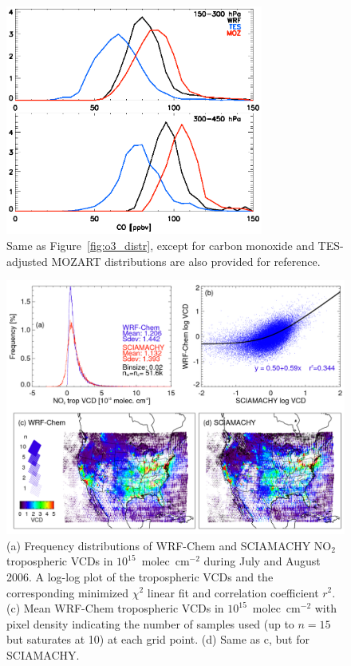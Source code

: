  \begin{figure}
 \noindent\includegraphics[width=20pc]{figures/co/co_teswrfhist.eps} %
 \caption{Same as Figure~\ref{fig:o3_distr}, except for carbon monoxide and TES-adjusted
MOZART distributions are also provided for reference.}
 \label{fig:co_distr}
 \end{figure}

 \begin{figure}
 \noindent\includegraphics[width=40pc]{figures/scia_no2.png}
 \caption{(a) Frequency distributions of WRF-Chem and SCIAMACHY NO$_2$ tropospheric
VCDs in $10^{15}$~molec~cm$^{-2}$ during July and August 2006. A log-log plot of the
tropospheric VCDs and the corresponding minimized $\chi^2$ linear fit and correlation
coefficient $r^2$. (c) Mean WRF-Chem tropospheric VCDs in $10^{15}$~molec~cm$^{-2}$
with pixel density indicating the number of samples used (up to $n=15$ but saturates at
10) at each grid point. (d) Same as c, but for SCIAMACHY.}
 \label{fig:scia_no2}
 \end{figure}

